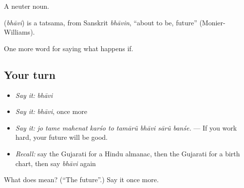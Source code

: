 A neuter noun.

\begin{cousinweb}
\textbf{} (\emph{bhāvi}) is a tatsama, from Sanskrit \emph{bhāvin}, \textquotedblleft{}about to be, future\textquotedblright{} (Monier-Williams).
\end{cousinweb}

\begin{grammarlens}[title={What you've built}]
One more word for saying what happens if.
\end{grammarlens}

\subsection*{Your turn}
\begin{itemize}
\raggedright
  \item \emph{Say it:} \emph{bhāvi}
  \item \emph{Say it:} \emph{bhāvi}, once more
  \item \emph{Say it:} \emph{jo tame mahenat karśo to tamārũ bhāvi sārũ banśe.} — If you work hard, your future will be good.
  \item \emph{Recall:} say the Gujarati for a Hindu almanac, then the Gujarati for a birth chart, then say \emph{bhāvi} again
\end{itemize}

\begin{tcolorbox}[breakable,colback=teal!4,colframe=teal!35!black,title={Before you move on}]
What does  mean? (\textquotedblleft{}The future\textquotedblright{}.) Say it once more.
\end{tcolorbox}
